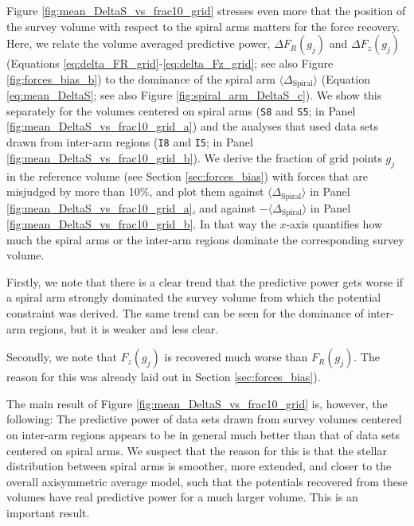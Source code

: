 \documentclass[iop,revtex4,numberedappendix,appendixfloats]{emulateapj}
\newcommand{\hiddenComment}[1]{}
\begin{document}
Figure \ref{fig:mean_DeltaS_vs_frac10_grid} stresses even more that the position of the survey volume with respect to the spiral arms matters for the force recovery. Here, we relate the volume averaged predictive power, $\Delta F_R(g_j)$ and $\Delta F_z(g_j)$ (Equations \eqref{eq:delta_FR_grid}-\eqref{eq:delta_Fz_grid}; see also Figure \ref{fig:forces_bias_b}) to the dominance of the spiral arm $\langle \Delta_\text{Spiral} \rangle$ (Equation \eqref{eq:mean_DeltaS}; see also Figure \ref{fig:spiral_arm_DeltaS_c}). We show this separately for the volumes centered on spiral arms (\texttt{S8} and \texttt{S5}; in Panel \ref{fig:mean_DeltaS_vs_frac10_grid_a}) and the analyses that used data sets drawn from inter-arm regions (\texttt{I8} and \texttt{I5}; in Panel \ref{fig:mean_DeltaS_vs_frac10_grid_b}). We derive the fraction of grid points $g_j$ in the reference volume (see Section \ref{sec:forces_bias}) with forces that are misjudged by more than 10\%, and plot them against $\langle \Delta_\text{Spiral} \rangle$ in Panel \ref{fig:mean_DeltaS_vs_frac10_grid_a}, and against $-\langle \Delta_\text{Spiral} \rangle$ in Panel \ref{fig:mean_DeltaS_vs_frac10_grid_b}. In that way the $x$-axis quantifies how much the spiral arms or the inter-arm regions dominate the corresponding survey volume. 

Firstly, we note that there is a clear trend that the predictive power gets worse if a spiral arm strongly dominated the survey volume from which the potential constraint was derived. The same trend can be seen for the dominance of inter-arm regions, but it is weaker and less clear.

Secondly, we note that $F_z(g_j)$ is recovered much worse than $F_R(g_j)$. The reason for this was already laid out in Section \ref{sec:forces_bias}). 

The main result of Figure \ref{fig:mean_DeltaS_vs_frac10_grid} is, however, the following: The predictive power of data sets drawn from survey volumes centered on inter-arm regions appears to be in general much better than that of data sets centered on spiral arms. We suspect that the reason for this is that the stellar distribution between spiral arms is smoother, more extended, and closer to the overall axisymmetric average model, such that the potentials recovered from these volumes have real predictive power for a much larger volume. This is an important result.

\hiddenComment{[TO DO: HW writes about the above discussion: "We should discuss this. I am still not 100\% sure I get the point. Is the fact that we predic the potential far away from most stars correctly a consequence of having used a clever functional form.." Jo writes: "Probably comes from the fact that the N-body model was setup with a simple model for the Milky Way. But I think we can just not discuss this in the current paper."]}
\end{document}
